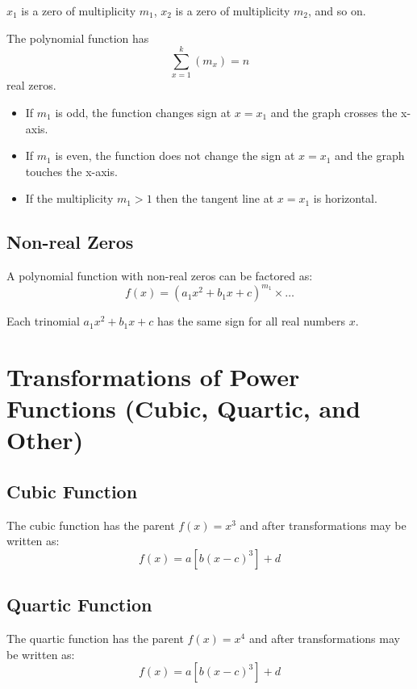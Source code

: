 			$x_1$ is a zero of multiplicity $m_1$, $x_2$ is a zero of multiplicity $m_2$, and so on.

			The polynomial function has
			\[\sum_{x=1}^{k}(m_x) = n\]
			real zeros.

			\begin{itemize}
				\item If $m_1$ is odd, the function changes sign at $x=x_1$ and the graph crosses the x-axis.
				\item If $m_1$ is even, the function does not change the sign at $x=x_1$ and the graph touches the x-axis.
				\item If the multiplicity $m_1 > 1$ then the tangent line at $x=x_1$ is horizontal. 
			\end{itemize}
		\subsection{Non-real Zeros}
			A polynomial function with non-real zeros can be factored as:
			\[f(x)=(a_1x^2+b_1x+c)^{m_1}\times\dots\]

			Each trinomial $a_1x^2+b_1x+c$ has the same sign for all real numbers $x$.
	\section{Transformations of Power Functions (Cubic, Quartic, and Other)}
		\subsection{Cubic Function}
			The cubic function has the parent $f(x)=x^3$ and after transformations may be written as:
			\[f(x)=a[b(x-c)^3]+d\]
			\vspace{\baselineskip}
			\begin{center}
			\end{center}
		\subsection{Quartic Function}
			The quartic function has the parent $f(x)=x^4$ and after transformations may be written as:
			\[f(x)=a[b(x-c)^3]+d\]
			\vspace{\baselineskip}
			\begin{center}
			\end{center}
